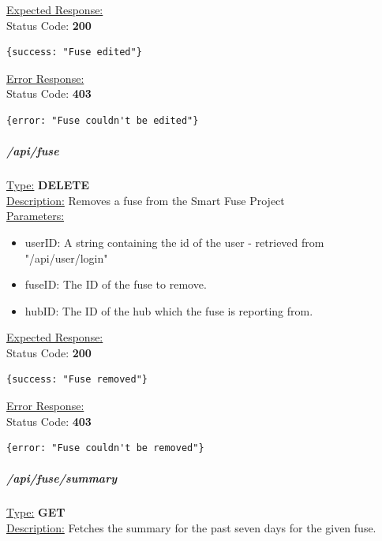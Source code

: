 \documentclass[preprint,12pt,3p]{elsarticle}
\newcommand{\forceindent}{\leavevmode{\parindent=1em\indent}}
\begin{document}
\underline{Expected Response:}\\[5pt]
\forceindent Status Code: \textbf{200} \\
\begin{verbatim}
{success: "Fuse edited"}
\end{verbatim}
\underline{Error Response:}\\[5pt]
\forceindent Status Code: \textbf{403} \\
\begin{verbatim}
{error: "Fuse couldn't be edited"}
\end{verbatim}

\subparagraph*{/api/fuse}
\underline{Type:} \textbf{DELETE}\\

\underline{Description:} Removes a fuse from the Smart Fuse Project\\

\underline{Parameters:}
\begin{itemize}
\item userID: A string containing the id of the user - retrieved from "/api/user/login"

\item fuseID: The ID of the fuse to remove.

\item hubID: The ID of the hub which the fuse is reporting from.

\end{itemize}
\underline{Expected Response:}\\[5pt]
\forceindent Status Code: \textbf{200} \\
\begin{verbatim}
{success: "Fuse removed"}
\end{verbatim}
\underline{Error Response:}\\[5pt]
\forceindent Status Code: \textbf{403} \\
\begin{verbatim}
{error: "Fuse couldn't be removed"}
\end{verbatim}

\subparagraph*{/api/fuse/summary}
\underline{Type:} \textbf{GET}\\

\underline{Description:} Fetches the summary for the past seven days for the given fuse.\\
\end{document}
